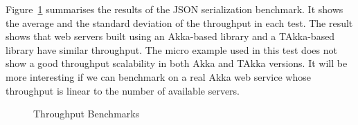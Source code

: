 Figure~\ref{fig:throughput} summarises the results of the JSON serialization 
benchmark.  It shows the average and the standard deviation of the throughput 
in each test.  The result shows that web servers built using an Akka-based 
library and a TAkka-based library have similar throughput.  The micro example
used in this test does not show a good throughput scalability in both Akka
and TAkka versions.  It will be more interesting if we can benchmark on a real Akka web service
whose throughput is linear to the number of available servers.






\begin{figure}[h]
     \begin{center}
    \end{center}
     \caption{Throughput Benchmarks}
   \label{fig:throughput}
\end{figure}

